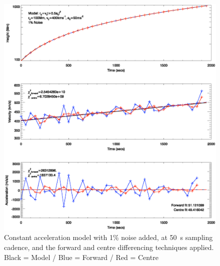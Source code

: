 \documentclass[namedreferences]{SolarPhysics}
\begin{document}
\begin{article}
\begin{figure}
 \centerline{\includegraphics[width=\linewidth]{images/const_a_forward_centre_noise001.ps}}
   \caption{Constant acceleration model with 1\% noise added, at 50~s sampling cadence, and the forward and centre differencing techniques applied. Black = Model / Blue = Forward / Red = Centre}
    \label{const_a_forward_centre_noise001}
\end{figure}


\end{article}
\end{document}
